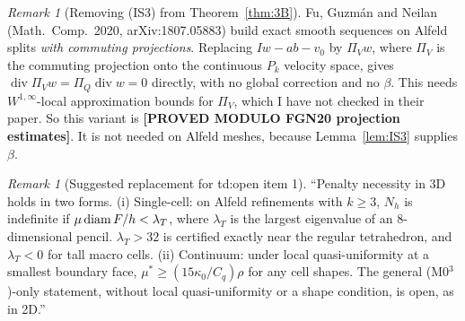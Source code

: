 \documentclass[11pt]{article}
\theoremstyle{remark}\newtheorem{remark}[theorem]{Remark}
\newcommand{\lab}[1]{\textbf{[#1]}}
\begin{document}
\begin{remark}[Removing (IS3) from Theorem~\ref{thm:3B}]
Fu, Guzm\'an and Neilan (Math.\ Comp.\ 2020, arXiv:1807.05883) build exact smooth sequences on Alfeld splits \emph{with commuting projections}. Replacing $Iw-ab-v_0$ by $\Pi_V w$, where $\Pi_V$ is the commuting projection onto the continuous $P_k$ velocity space, gives $\operatorname{div}\Pi_Vw=\Pi_Q\operatorname{div}w=0$ directly, with no global correction and no $\beta$. This needs $W^{1,\infty}$-local approximation bounds for $\Pi_V$, which I have not checked in their paper. So this variant is \lab{PROVED MODULO FGN20 projection estimates}. It is not needed on Alfeld meshes, because Lemma~\ref{lem:IS3} supplies $\beta$.
\end{remark}

\begin{remark}[Suggested replacement for td:open item 1]
``Penalty necessity in 3D holds in two forms. (i) Single-cell: on Alfeld refinements with $k\ge3$, $N_h$ is indefinite if $\mu\operatorname{diam} F/h<\lambda_T$, where $\lambda_T$ is the largest eigenvalue of an $8$-dimensional pencil. $\lambda_T>32$ is certified exactly near the regular tetrahedron, and $\lambda_T<0$ for tall macro cells. (ii) Continuum: under local quasi-uniformity at a smallest boundary face, $\mu^\ast\ge(15\kappa_0/C_q)\rho$ for any cell shapes. The general (M0$^3$)-only statement, without local quasi-uniformity or a shape condition, is open, as in 2D.''
\end{remark}
\end{document}

